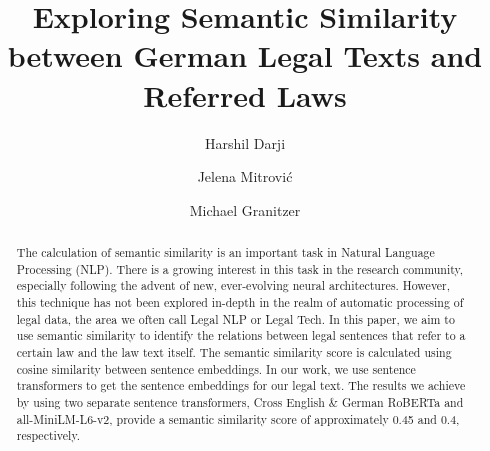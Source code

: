 \documentclass[runningheads]{llncs}
\begin{document}
\title{Exploring Semantic Similarity between German Legal Texts and Referred Laws}

\author{Harshil Darji \and
Jelena Mitrović \and
Michael Granitzer}



\maketitle

\begin{abstract}
The calculation of semantic similarity is an important task in Natural Language Processing (NLP). There is a growing interest in this task in the research community, especially following the advent of new, ever-evolving neural architectures. However, this technique has not been explored in-depth in the realm of automatic processing of legal data, the area we often call Legal NLP or Legal Tech. In this paper, we aim to use semantic similarity to identify the relations between legal sentences that refer to a certain law and the law text itself. The semantic similarity score is calculated using cosine similarity between sentence embeddings. In our work, we use sentence transformers to get the sentence embeddings for our legal text. The results we achieve by using two separate sentence transformers, Cross English \& German RoBERTa and all-MiniLM-L6-v2, provide a semantic similarity score of approximately 0.45 and 0.4, respectively.


\end{abstract}

\end{document}
